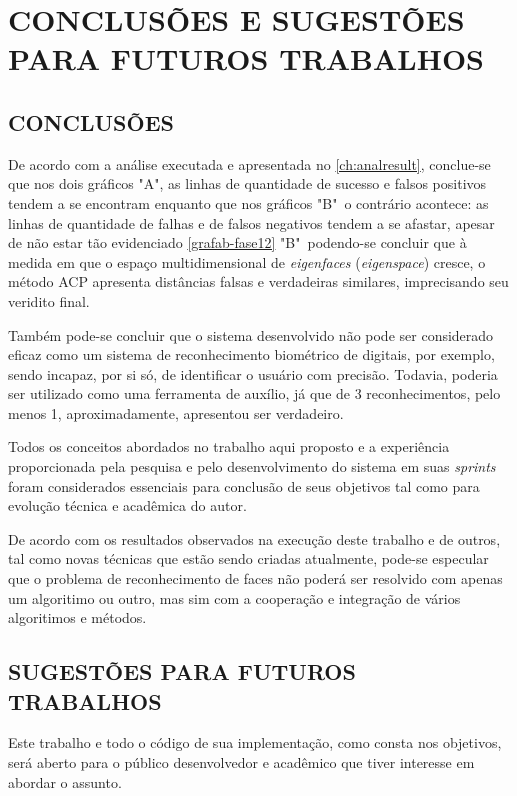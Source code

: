 
\chapter{CONCLUSÕES E SUGESTÕES PARA FUTUROS TRABALHOS}\label{ch:conclusao}
\section{CONCLUSÕES} 

De acordo com a análise executada e apresentada no \autoref{ch:analresult}, conclue-se que nos dois gráficos "A", as linhas de quantidade de sucesso e falsos positivos tendem a se encontram enquanto que nos gráficos "B"\, o contrário acontece: as linhas de quantidade de falhas e de falsos negativos tendem a se afastar, apesar de não estar tão evidenciado \autoref{grafab-fase12} "B"\, podendo-se concluir que à medida em que o espaço multidimensional de \textit{eigenfaces} (\textit{eigenspace}) cresce, o método ACP apresenta distâncias falsas e verdadeiras similares, imprecisando seu veridito final.

Também pode-se concluir  que o sistema desenvolvido não pode ser considerado eficaz como um sistema de reconhecimento biométrico de digitais, por exemplo, sendo incapaz, por si só, de identificar o usuário com precisão. Todavia, poderia ser utilizado como uma ferramenta de auxílio, já que de 3 reconhecimentos, pelo menos 1, aproximadamente, apresentou ser verdadeiro.

Todos os conceitos abordados no trabalho aqui proposto e a experiência proporcionada pela pesquisa e pelo desenvolvimento do sistema em suas \textit{sprints} foram considerados essenciais para conclusão de seus objetivos tal como para evolução técnica e acadêmica do autor. 

De acordo com os resultados observados na execução deste trabalho e de outros, tal como novas técnicas que estão sendo criadas atualmente, pode-se especular que o problema de reconhecimento de faces não poderá ser resolvido com apenas um algoritimo ou outro, mas sim com a cooperação e integração de vários algoritimos e métodos.


\section{SUGESTÕES PARA FUTUROS TRABALHOS}


Este trabalho e todo o código de sua implementação, como consta nos objetivos, será aberto para o público desenvolvedor e acadêmico que tiver interesse em abordar o assunto. 

